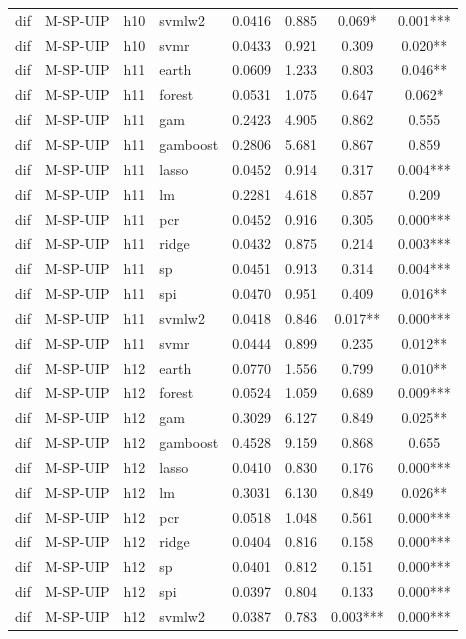 \begin{ThreePartTable}
\begin{longtable}[t]{llclcccc}
dif & M-SP-UIP & h10 & svmlw2 & 0.0416 & 0.885 & 0.069* & 0.001***\\
dif & M-SP-UIP & h10 & svmr & 0.0433 & 0.921 & 0.309 & 0.020**\\
\addlinespace
dif & M-SP-UIP & h11 & earth & 0.0609 & 1.233 & 0.803 & 0.046**\\
dif & M-SP-UIP & h11 & forest & 0.0531 & 1.075 & 0.647 & 0.062*\\
dif & M-SP-UIP & h11 & gam & 0.2423 & 4.905 & 0.862 & 0.555\\
dif & M-SP-UIP & h11 & gamboost & 0.2806 & 5.681 & 0.867 & 0.859\\
dif & M-SP-UIP & h11 & lasso & 0.0452 & 0.914 & 0.317 & 0.004***\\
dif & M-SP-UIP & h11 & lm & 0.2281 & 4.618 & 0.857 & 0.209\\
dif & M-SP-UIP & h11 & pcr & 0.0452 & 0.916 & 0.305 & 0.000***\\
dif & M-SP-UIP & h11 & ridge & 0.0432 & 0.875 & 0.214 & 0.003***\\
dif & M-SP-UIP & h11 & sp & 0.0451 & 0.913 & 0.314 & 0.004***\\
dif & M-SP-UIP & h11 & spi & 0.0470 & 0.951 & 0.409 & 0.016**\\
dif & M-SP-UIP & h11 & svmlw2 & 0.0418 & 0.846 & 0.017** & 0.000***\\
dif & M-SP-UIP & h11 & svmr & 0.0444 & 0.899 & 0.235 & 0.012**\\
\addlinespace
dif & M-SP-UIP & h12 & earth & 0.0770 & 1.556 & 0.799 & 0.010**\\
dif & M-SP-UIP & h12 & forest & 0.0524 & 1.059 & 0.689 & 0.009***\\
dif & M-SP-UIP & h12 & gam & 0.3029 & 6.127 & 0.849 & 0.025**\\
dif & M-SP-UIP & h12 & gamboost & 0.4528 & 9.159 & 0.868 & 0.655\\
dif & M-SP-UIP & h12 & lasso & 0.0410 & 0.830 & 0.176 & 0.000***\\
dif & M-SP-UIP & h12 & lm & 0.3031 & 6.130 & 0.849 & 0.026**\\
dif & M-SP-UIP & h12 & pcr & 0.0518 & 1.048 & 0.561 & 0.000***\\
dif & M-SP-UIP & h12 & ridge & 0.0404 & 0.816 & 0.158 & 0.000***\\
dif & M-SP-UIP & h12 & sp & 0.0401 & 0.812 & 0.151 & 0.000***\\
dif & M-SP-UIP & h12 & spi & 0.0397 & 0.804 & 0.133 & 0.000***\\
dif & M-SP-UIP & h12 & svmlw2 & 0.0387 & 0.783 & 0.003*** & 0.000***\\

\end{longtable}
\end{ThreePartTable}
